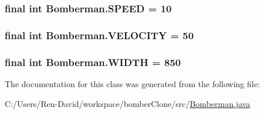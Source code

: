 \subsubsection[{S\+P\+E\+E\+D}]{\setlength{\rightskip}{0pt plus 5cm}final int Bomberman.\+S\+P\+E\+E\+D = 10\hspace{0.3cm}{\ttfamily [static]}}\label{class_bomberman_a0459d0744420f2371539f445df243505}
\hypertarget{class_bomberman_ab3f0863e5f567dc7bfc24cd3ef53d8e0}{}
\subsubsection[{V\+E\+L\+O\+C\+I\+T\+Y}]{\setlength{\rightskip}{0pt plus 5cm}final int Bomberman.\+V\+E\+L\+O\+C\+I\+T\+Y = 50\hspace{0.3cm}{\ttfamily [static]}}\label{class_bomberman_ab3f0863e5f567dc7bfc24cd3ef53d8e0}
\hypertarget{class_bomberman_a7730b9bf04c6b3bb99edc89e93c13f6c}{}
\subsubsection[{W\+I\+D\+T\+H}]{\setlength{\rightskip}{0pt plus 5cm}final int Bomberman.\+W\+I\+D\+T\+H = 850\hspace{0.3cm}{\ttfamily [static]}}\label{class_bomberman_a7730b9bf04c6b3bb99edc89e93c13f6c}


The documentation for this class was generated from the following file\+:\begin{DoxyCompactItemize}
\item 
C\+:/\+Users/\+Ren-\/\+David/workspace/bomber\+Clone/src/\hyperlink{_bomberman_8java}{Bomberman.\+java}\end{DoxyCompactItemize}
